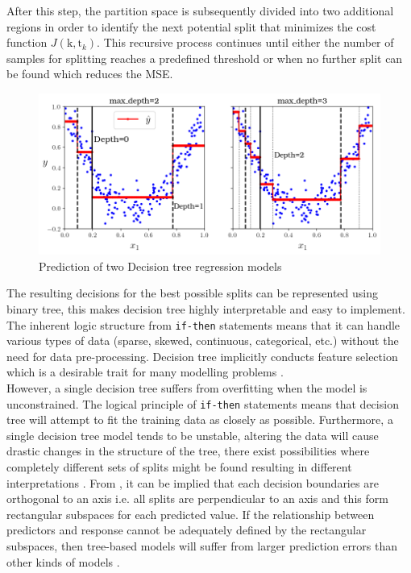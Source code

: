 After this step, the partition space is subsequently divided into two additional regions in order to identify the next potential split that minimizes the cost function $J(\text{k},\text{t}_k)$. This recursive process continues until either the number of samples for splitting reaches a predefined threshold or when no further split can be found which reduces the MSE.\\


\begin{figure}[h]
    \centering
    \includegraphics[width=.9\textwidth]{02_figures/fig6_5_partspace_geron09.png}
    \caption{Prediction of two Decision tree regression models }
    \label{fig:geron6_5}
\end{figure}

The resulting decisions for the best possible splits can be represented using binary tree, this makes decision tree highly interpretable and easy to implement. The inherent logic structure from {\tt if-then} statements means that it can handle various types of data (sparse, skewed, continuous, categorical, etc.) without the need for data pre-processing. Decision tree implicitly conducts feature selection which is a desirable trait for many modelling problems .\\

However, a single decision tree suffers from overfitting when the model is unconstrained. The logical principle of {\tt if-then} statements means that decision tree will attempt to fit the training data as closely as possible. Furthermore, a single decision tree model tends to be unstable, altering the data will cause drastic changes in the structure of the tree, there exist possibilities where completely different sets of splits might be found resulting in different interpretations . From , it can be implied that each decision boundaries are orthogonal to an axis i.e. all splits are perpendicular to an axis and this form rectangular subspaces for each predicted value. If the relationship between predictors and response cannot be adequately defined by the rectangular subspaces, then tree-based models will suffer from larger prediction errors than other kinds of models .\\

